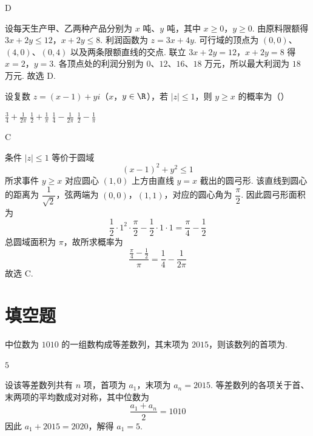 \begin{answer}
D
\end{answer}

\begin{solution}
设每天生产甲、乙两种产品分别为 \(x\) 吨、\(y\) 吨，其中 \(x\geqslant0\)，\(y\geqslant0\). 由原料限额得
\(3x+2y\leqslant12\)，\(x+2y\leqslant8\).
利润函数为 \(z=3x+4y\). 可行域的顶点为 \((0,0)\)、\((4,0)\)、\((0,4)\) 以及两条限额直线的交点. 联立
\(3x+2y=12\)，\(x+2y=8\)
得 \(x=2\)，\(y=3\). 各顶点处的利润分别为 \(0\)、\(12\)、\(16\)、\(18\) 万元，所以最大利润为 \(18\) 万元. 故选 D.
\end{solution}

\begin{problem}
设复数 \(z = (x - 1) + yi\)（\(x\)，\(y \in \R\)），若 \(|z| \leqslant 1\)，则 \(y \geqslant x\) 的概率为（\quad）

\choices
    {\(\frac{3}{4} + \frac{1}{2\pi}\)}
    {\(\frac{1}{2} + \frac{1}{\pi}\)}
    {\(\frac{1}{4} - \frac{1}{2\pi}\)}
    {\(\frac{1}{2} - \frac{1}{\pi}\)}
\end{problem}

\begin{answer}
C
\end{answer}

\begin{solution}
条件 \(|z|\leqslant1\) 等价于圆域
\[
(x-1)^2+y^2\leqslant1
\]
所求事件 \(y\geqslant x\) 对应圆心 \((1,0)\) 上方由直线 \(y=x\) 截出的圆弓形. 该直线到圆心的距离为 \(\dfrac{1}{\sqrt{2}}\)，弦两端为 \((0,0)\)，\((1,1)\)，对应的圆心角为 \(\dfrac{\pi}{2}\). 因此圆弓形面积为
\[
\frac{1}{2}\cdot1^2\cdot\frac{\pi}{2}-\frac{1}{2}\cdot1\cdot1=\frac{\pi}{4}-\frac{1}{2}
\]
总圆域面积为 \(\pi\)，故所求概率为
\[
\frac{\frac{\pi}{4}-\frac{1}{2}}{\pi}=\frac{1}{4}-\frac{1}{2\pi}
\]
故选 C.
\end{solution}

\section{填空题}

\begin{problem}
中位数为 \(1010\) 的一组数构成等差数列，其末项为 \(2015\)，则该数列的首项为\fillinblank{}.
\end{problem}

\begin{answer}
\(5\)
\end{answer}

\begin{solution}
设该等差数列共有 \(n\) 项，首项为 \(a_1\)，末项为 \(a_n=2015\). 等差数列的各项关于首、末两项的平均数成对对称，其中位数为
\[
\frac{a_1+a_n}{2}=1010
\]
因此 \(a_1+2015=2020\)，解得 \(a_1=5\).
\end{solution}

